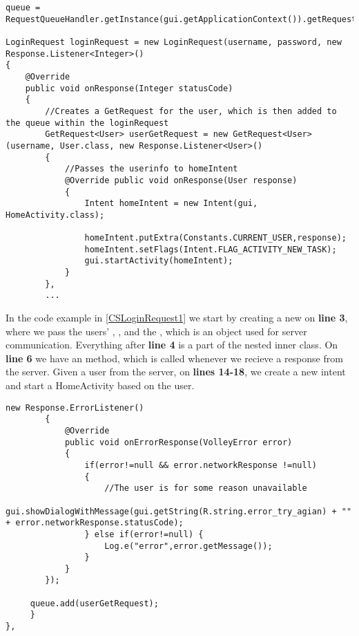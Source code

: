 \begin{minipage}[H]{\linewidth}
\begin{lstlisting}[caption = Initial request the respective server response object, label = CSLoginRequest1]
queue = RequestQueueHandler.getInstance(gui.getApplicationContext()).getRequestQueue();

LoginRequest loginRequest = new LoginRequest(username, password, new Response.Listener<Integer>() 
{
	@Override
    public void onResponse(Integer statusCode) 
    {
    	//Creates a GetRequest for the user, which is then added to the queue within the loginRequest 
    	GetRequest<User> userGetRequest = new GetRequest<User>(username, User.class, new Response.Listener<User>() 
    	{ 
    		//Passes the userinfo to homeIntent 
    		@Override public void onResponse(User response) 
    		{
	            Intent homeIntent = new Intent(gui, HomeActivity.class);
	            
                homeIntent.putExtra(Constants.CURRENT_USER,response);
                homeIntent.setFlags(Intent.FLAG_ACTIVITY_NEW_TASK);
                gui.startActivity(homeIntent);
            }
        },
        ...
\end{lstlisting}
\end{minipage}

In the code example in \autoref{CSLoginRequest1} we start by creating a new
 on \textbf{line 3}, where we pass the users'
, , and the , which is
an object used for server communication. Everything after \textbf{line 4} is
a part of the  nested inner class. On \textbf{line 6} we
have an  method, which is called whenever we recieve a
response from the server. Given a user from the server, on \textbf{lines 14-18},
we create a new intent and start a HomeActivity based on the user.\nl

\begin{minipage}[H]{\linewidth}
\begin{lstlisting}[caption = Using an errorListener to detect mishaps in the GetUserRequest, label = CSLoginRequest2]
        new Response.ErrorListener() 
        {
        	@Override
            public void onErrorResponse(VolleyError error) 
            {
            	if(error!=null && error.networkResponse !=null) 
            	{
            		//The user is for some reason unavailable
            	     gui.showDialogWithMessage(gui.getString(R.string.error_try_agian) + "" + error.networkResponse.statusCode);
                } else if(error!=null) {
                	Log.e("error",error.getMessage());
                }
            }
        });
        
     queue.add(userGetRequest);
     }
},
\end{lstlisting}
\end{minipage}

